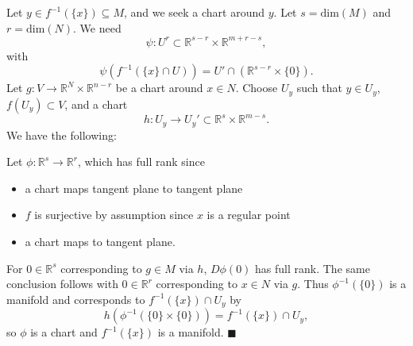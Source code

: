 \documentclass[letter-paper]{tufte-book}
\newenvironment{proof}[1][Proof]{\begin{trivlist}
\item[\hskip \labelsep {\bfseries #1}]}{\end{trivlist}}
\newcommand{\qed}{\hfill$\blacksquare$}
\begin{document}
\begin{proof}
  Let $y \in f^{-1}(\{x\}) \subseteq M$, and we seek a chart around $y$. Let $s
  = \mbox{dim}(M)$ and $r = \mbox{dim}(N)$. We need
  \begin{equation*}
    \psi : U^r \subset \mathbb{R}^{s-r} \times \mathbb{R}^{m+r-s},
  \end{equation*}
  with
  \begin{equation*}
    \psi\left(f^{-1}(\{x\} \cap U)\right) = U' \cap \left(\mathbb{R}^{s-r} \times \{0\}\right).
  \end{equation*}
  Let $g : V \to \mathbb{R}^N \times \mathbb{R}^{n-r}$ be a chart around $x\in
  N$. Choose $U_y$ such that $y \in U_y$, $f(U_y) \subset V$, and a chart
  \begin{equation*}
    h : U_y \to U_y' \subset \mathbb{R}^s \times \mathbb{R}^{m-s}.
  \end{equation*}
  We have the following:
  
  
  Let $\phi : \mathbb{R}^s \to \mathbb{R}^r$, which has full rank since
  \begin{itemize}
    \item a chart maps tangent plane to tangent plane
    \item $f$ is surjective by assumption since $x$ is a regular point
    \item a chart maps to tangent plane.
  \end{itemize}
  For $0 \in \mathbb{R}^s$ corresponding to $g\in M$ via $h$, $D\phi(0)$ has
  full rank. The same conclusion follows with $0 \in \mathbb{R}^r$ corresponding
  to $x\in N$ via $g$. Thus $\phi^{-1}(\{0\})$ is a manifold and corresponds to
  $f^{-1}(\{x\}) \cap U_y$ by
  \begin{equation*}
    h\left(\phi^{-1}(\{0\} \times \{0\})\right) = f^{-1}(\{x\}) \cap U_y,
  \end{equation*}
  so $\phi$ is a chart and $f^{-1}(\{x\})$ is a manifold. \qed
\end{proof}

\end{document}
